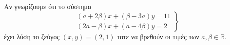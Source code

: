 Αν γνωρίζουμε ότι το σύστημα
\[
\left.\begin{array}{l}
(a+2 \beta) x+(\beta-3 a) y=11 \\
(2 a-\beta) x+(a-4 \beta) y=2
\end{array}\right\}
\]
έχει λύση το ζεύγος $ (x,y)=(2,1) $ τοτε να βρεθούν οι τιμές των $ a,\beta\in\mathbb{R} $.
